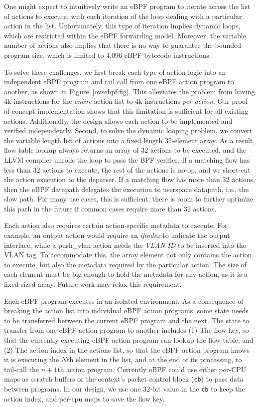 \documentclass[10pt,numbers,reprint]{sigplanconf}
\begin{document}
One might expect to intuitively write an eBPF program to iterate across the
list of actions to execute, with each iteration of the loop dealing with a
particular action in the list.  Unfortunately, this type of iteration implies
dynamic loops, which are restricted within the eBPF forwarding model. Moreover,
the variable number of actions also implies that there is no way to guarantee
the bounded program size, which is limited to 4,096 eBPF bytecode instructions.

To solve these challenges, we first break each type of action logic into an
independent eBPF program and tail call from one eBPF action program to
another, as shown in Figure~\ref{ovsebpf:fig}.  This alleviates
the problem from having 4k instructions for the {\em entire} action list to 4k
instructions {\em per action}.  Our proof-of-concept implementation shows that
this limitation is sufficient for all existing actions.  Additionally, the
design allows each action to be implemented and verified independently.
Second, to solve the dynamic looping problem, we convert the variable length
list of actions into a fixed length 32-element array.  As a result,
flow table lookup always returns an array of 32 actions to be executed,
and the LLVM compiler unrolls the loop to pass the BPF verifier.
If a matching flow has less than 32 actions to execute, the rest of the
actions is no-op, and we short-cut the action execution to the deparser.
If a matching flow has more than 32 actions, then the eBPF datapath delegates
the execution to userspace datapath, i.e., the slow path. For many use cases,
this is sufficient; there is room to further optimize this path in the future
if common cases require more than 32 actions.

Each action also requires certain action-specific metadata to execute.
For example, an output action would require an {\em ifindex} to
indicate the output interface, while a push\_vlan action needs the {\em VLAN ID}
to be inserted into the VLAN tag.  To accommodate this, the array element not
only contains the action to execute, but also the metadata required by the
particular action. The size of each element must be big enough to hold the
metadata for any action, as it is a fixed sized array. Future work may
relax this requirement.

Each eBPF program executes in an isolated environment. As a consequence
of breaking the action list into individual eBPF action programs, some state needs to be
transferred between the current eBPF program and the next.
The state to transfer from one eBPF action program to another includes
(1) The flow key, so that the currently executing eBPF action program can
lookup the flow table, and (2) The action index in the actions list, so that
the eBPF action program knows it is executing the $N$th element in the list,
and at the end of its processing, to tail-call the $n+1$th action program.
Currently eBPF could use either per-CPU maps as scratch buffers or the
context's packet control block (\verb+cb+) to pass data between programs. In our
design, we use one 32-bit value in the \verb+cb+ to keep the action
index, and per-cpu maps to save the flow key.
\end{document}
